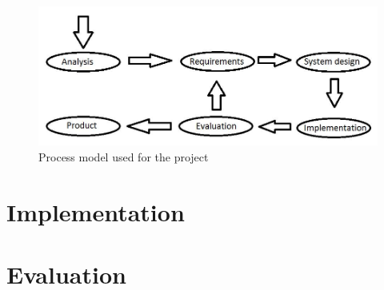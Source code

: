 \begin{figure}[h]
\centering
\includegraphics[scale=0.35]{billeder/process-model}
\caption{Process model used for the project}
\label{pm}
\end{figure}

\section{Implementation}
\label{sec:i1Implementation}

\section{Evaluation}
\label{sec:i1Evaluation}
